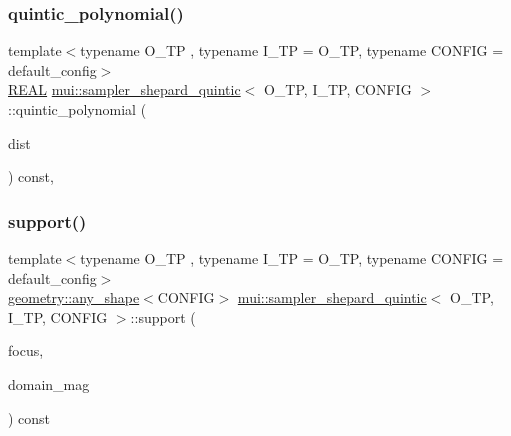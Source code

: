 \subsubsection{\texorpdfstring{quintic\+\_\+polynomial()}{quintic\_polynomial()}}
{\footnotesize\ttfamily template$<$typename O\+\_\+\+TP , typename I\+\_\+\+TP  = O\+\_\+\+TP, typename C\+O\+N\+F\+IG  = default\+\_\+config$>$ \\
\hyperlink{classmui_1_1sampler__shepard__quintic_ae674072eac8556d3520cf5f6c1eb7ae6}{R\+E\+AL} \hyperlink{classmui_1_1sampler__shepard__quintic}{mui\+::sampler\+\_\+shepard\+\_\+quintic}$<$ O\+\_\+\+TP, I\+\_\+\+TP, C\+O\+N\+F\+IG $>$\+::quintic\+\_\+polynomial (\begin{DoxyParamCaption}\item[{const \hyperlink{classmui_1_1sampler__shepard__quintic_ae674072eac8556d3520cf5f6c1eb7ae6}{R\+E\+AL}}]{dist }\end{DoxyParamCaption}) const\hspace{0.3cm}{\ttfamily [inline]}, {\ttfamily [protected]}}

\mbox{\label{classmui_1_1sampler__shepard__quintic_a61d9b8c4933a910d14e6c61852019123}} 
\subsubsection{\texorpdfstring{support()}{support()}}
{\footnotesize\ttfamily template$<$typename O\+\_\+\+TP , typename I\+\_\+\+TP  = O\+\_\+\+TP, typename C\+O\+N\+F\+IG  = default\+\_\+config$>$ \\
\hyperlink{classmui_1_1geometry_1_1any__shape}{geometry\+::any\+\_\+shape}$<$C\+O\+N\+F\+IG$>$ \hyperlink{classmui_1_1sampler__shepard__quintic}{mui\+::sampler\+\_\+shepard\+\_\+quintic}$<$ O\+\_\+\+TP, I\+\_\+\+TP, C\+O\+N\+F\+IG $>$\+::support (\begin{DoxyParamCaption}\item[{\hyperlink{classmui_1_1sampler__shepard__quintic_ac80518ba9645191b9d6e2fbee760e031}{point\+\_\+type}}]{focus,  }\item[{\hyperlink{classmui_1_1sampler__shepard__quintic_ae674072eac8556d3520cf5f6c1eb7ae6}{R\+E\+AL}}]{domain\+\_\+mag }\end{DoxyParamCaption}) const\hspace{0.3cm}{\ttfamily [inline]}}



